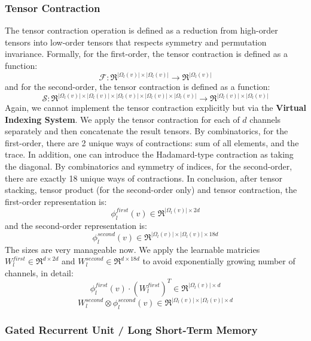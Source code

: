\documentclass[a4paper]{article}
\begin{document}
\subsubsection{Tensor Contraction}

The tensor contraction operation is defined as a reduction from high-order tensors into low-order tensors that respects symmetry and permutation invariance. Formally, for the first-order, the tensor contraction is defined as a function:
$$\mathcal{F}: \Re^{|\Omega_l(v)| \times |\Omega_l(v)|} \rightarrow \Re^{|\Omega_l(v)|}$$
and for the second-order, the tensor contraction is defined as a function:
$$\mathcal{S}: \Re^{|\Omega_l(v)| \times |\Omega_l(v)| \times|\Omega_l(v)| \times |\Omega_l(v)| \times |\Omega_l(v)|} \rightarrow \Re^{|\Omega_l(v)| \times |\Omega_l(v)|}$$
Again, we cannot implement the tensor contraction explicitly but via the \textbf{Virtual Indexing System}. We apply the tensor contraction for each of $d$ channels separately and then concatenate the result tensors. By combinatorics, for the first-order, there are 2 unique ways of contractions: sum of all elements, and the trace. In addition, one can introduce the Hadamard-type contraction as taking the diagonal. By combinatorics and symmetry of indices, for the second-order, there are exactly 18 unique ways of contractions. In conclusion, after tensor stacking, tensor product (for the second-order only) and tensor contraction, the first-order representation is:
$$\phi_l^{first}(v) \in \Re^{|\Omega_l(v)| \times 2d}$$
and the second-order representation is:
$$\phi_l^{second}(v) \in \Re^{|\Omega_l(v)| \times |\Omega_l(v)| \times 18d}$$
The sizes are very manageable now. We apply the learnable matricies $W_l^{first} \in \Re^{d \times 2d}$ and $W_l^{second} \in \Re^{d \times 18d}$ to avoid exponentially growing number of channels, in detail:
$$\phi_l^{first}(v) \cdot (W_l^{first})^T \in \Re^{|\Omega_l(v)| \times d}$$
$$W_l^{second} \otimes \phi_l^{second}(v) \in \Re^{|\Omega_l(v)| \times |\Omega_l(v)| \times d}$$

\subsubsection{Gated Recurrent Unit / Long Short-Term Memory}
\end{document}
